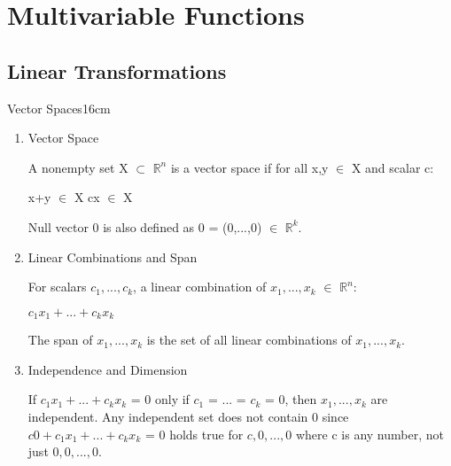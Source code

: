 \newpage

\section[Day 16: Multivariable Functions]{ Multivariable Functions }

\subsection{ Linear Transformations }

    \begin{definition}{Vector Spaces}{16cm}
        \begin{enumerate}[label=(\alph*), leftmargin=0.5cm, itemsep=0.1cm]
            \item {\color{lblue} Vector Space}
            
                A nonempty set X $\subset$ $\mathbb{R}^n$ is a vector space if
                for all x,y $\in$ X and scalar c:
        
                \hspace{0.5cm}
                x+y $\in$ X
                \hspace{1cm}
                cx $\in$ X

                Null vector 0 is also defined as 0 = (0,...,0) $\in$ $\mathbb{R}^k$.
            
            \item {\color{lblue} Linear Combinations and Span}
            
                For scalars $c_1,...,c_k$, a linear combination of
                $x_1,...,x_k$ $\in$ $\mathbb{R}^n$:
        
                \hspace{0.5cm}
                $c_1x_1 + ... + c_kx_k$
        
                The span of $x_1,...,x_k$ is the set of all linear combinations
                of $x_1,...,x_k$.

            \item {\color{lblue} Independence and Dimension}
                
                If $c_1x_1 + ... + c_kx_k$ = 0 only if $c_1$ = ... = $c_k$ = 0,
                then $x_1,...,x_k$ are independent.
                Any independent set does not contain 0 since
                $c0 + c_1x_1 + ... + c_kx_k$ = 0 holds true for
                $c,0,...,0$ where c is any number, not just $0,0,...,0$.


\end{enumerate}
\end{definition}
